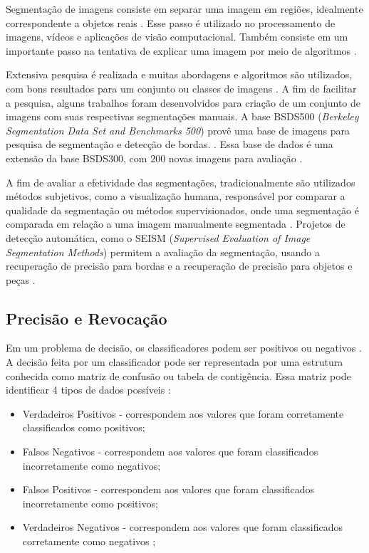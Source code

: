 \begin{document}
Segmentação de imagens consiste em separar uma imagem em regiões, idealmente correspondente a objetos reais \cite{ZHANG2008}. Esse passo é utilizado no processamento de imagens, vídeos e aplicações de visão computacional. Também consiste em um importante passo na tentativa de explicar uma imagem por meio de algoritmos \cite{ZHANG2008}.

Extensiva pesquisa é realizada e muitas abordagens e algoritmos são utilizados, com bons resultados para um conjunto ou classes de imagens \cite{ZHANG2008}. A fim de facilitar a pesquisa, alguns trabalhos foram desenvolvidos para criação de um conjunto de imagens com suas respectivas segmentações manuais. A base BSDS500 (\textit{Berkeley Segmentation Data Set and Benchmarks 500}) provê uma base de imagens para pesquisa de segmentação e detecção de bordas. \cite{BSDS500}. Essa base de dados é uma extensão da base BSDS300, com 200 novas imagens para avaliação \cite{BSDS500}.

A fim de avaliar a efetividade das segmentações, tradicionalmente são utilizados métodos subjetivos, como a visualização humana, responsável por comparar a qualidade da segmentação ou métodos supervisionados, onde uma segmentação é comparada em relação a uma imagem manualmente segmentada \cite{ZHANG2008}. Projetos de detecção automática, como o SEISM (\textit{Supervised Evaluation of Image Segmentation Methods}) permitem a avaliação da segmentação, usando a recuperação de precisão para bordas e a recuperação de precisão para objetos e peças \cite{SEISM}.


\subsection{Precisão e Revocação} \label{ssec:prec_recall}

Em um problema de decisão, os classificadores podem ser positivos ou negativos \cite{PRECISION_RECALL}. A decisão feita por um classificador pode ser representada por uma estrutura conhecida como matriz de confusão ou tabela de contigência. Essa matriz pode identificar 4 tipos de dados possíveis \cite{PRECISION_RECALL}:

\begin{itemize}
 \item Verdadeiros Positivos - correspondem aos valores que foram corretamente classificados como positivos;
 \item Falsos Negativos - correspondem aos valores que foram classificados incorretamente como negativos;
 \item Falsos Positivos - correspondem aos valores que foram classificados incorretamente como positivos;
 \item Verdadeiros Negativos - correspondem aos valores que foram classificados corretamente como negativos \cite{PRECISION_RECALL};
\end{itemize}
\end{document}
